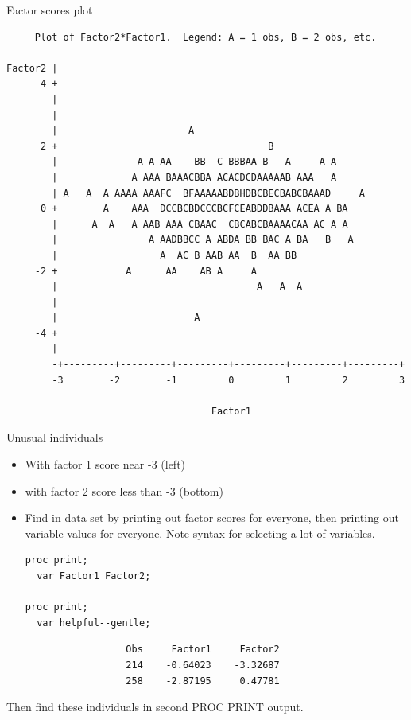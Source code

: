 \documentclass[pdf]{prosper}
\begin{document}
\begin{slide}{Factor scores plot}

{\scriptsize
\begin{verbatim}
     Plot of Factor2*Factor1.  Legend: A = 1 obs, B = 2 obs, etc.

Factor2 |
      4 +
        |
        |
        |                       A
      2 +                                     B
        |              A A AA    BB  C BBBAA B   A     A A
        |             A AAA BAAACBBA ACACDCDAAAAAB AAA   A
        | A   A  A AAAA AAAFC  BFAAAAABDBHDBCBECBABCBAAAD     A
      0 +        A    AAA  DCCBCBDCCCBCFCEABDDBAAA ACEA A BA
        |      A  A   A AAB AAA CBAAC  CBCABCBAAAACAA AC A A
        |                A AADBBCC A ABDA BB BAC A BA   B   A
        |                  A  AC B AAB AA  B  AA BB
     -2 +            A      AA    AB A     A
        |                                   A   A  A
        |
        |                        A
     -4 +
        |
        -+---------+---------+---------+---------+---------+---------+
        -3        -2        -1         0         1         2         3

                                    Factor1

\end{verbatim}
}
  
\end{slide}

\begin{slide}{Unusual individuals}

  \begin{itemize}
  \item With factor 1 score near -3 (left)
  \item with factor 2 score less than -3 (bottom)
  \item Find in data set by printing out factor scores for everyone, then printing out variable values for everyone. Note syntax for selecting a lot of variables. 

\begin{verbatim}
proc print;
  var Factor1 Factor2;

proc print;
  var helpful--gentle;

\end{verbatim}
  \end{itemize}
  

{\scriptsize
\begin{verbatim}
                     Obs     Factor1     Factor2
                     214    -0.64023    -3.32687
                     258    -2.87195     0.47781
\end{verbatim}
}

Then find these individuals in second PROC PRINT output.

\end{slide}
\end{document}
